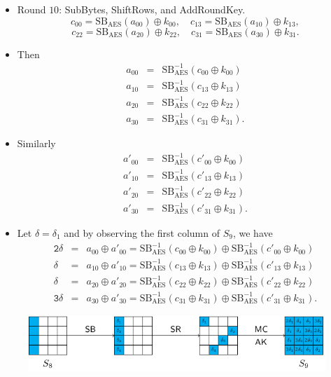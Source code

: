 \begin{frame}{}
    \begin{itemize}
        \item Round $10$: SubBytes, ShiftRows, and AddRoundKey.
\[
c_{00}=\text{SB}_{\text{AES}}(a_{00})\oplus k_{00},\quad c_{13}=\text{SB}_{\text{AES}}(a_{10})\oplus k_{13},
\]
\[
c_{22}=\text{SB}_{\text{AES}}(a_{20})\oplus k_{22},\quad
c_{31}=\text{SB}_{\text{AES}}(a_{30})\oplus k_{31}.
\] 
\item Then
\begin{eqnarray*}
    a_{00} &=& \text{SB}_{\text{AES}}^{-1}(c_{00}\oplus k_{00})\\
    a_{10} &=& \text{SB}_{\text{AES}}^{-1}(c_{13}\oplus k_{13})\\
    a_{20} &=& \text{SB}_{\text{AES}}^{-1}(c_{22}\oplus k_{22})\\
    a_{30} &=& \text{SB}_{\text{AES}}^{-1}(c_{31}\oplus k_{31}).
\end{eqnarray*}
\item Similarly
\begin{eqnarray*}
    a'_{00} &=& \text{SB}_{\text{AES}}^{-1}(c'_{00}\oplus k_{00})\\
    a'_{10} &=& \text{SB}_{\text{AES}}^{-1}(c'_{13}\oplus k_{13})\\
    a'_{20} &=& \text{SB}_{\text{AES}}^{-1}(c'_{22}\oplus k_{22})\\
    a'_{30} &=& \text{SB}_{\text{AES}}^{-1}(c'_{31}\oplus k_{31}).
\end{eqnarray*}
    \end{itemize}
\end{frame}


\begin{frame}{}
    \begin{itemize}
\item Let $\delta=\delta_1$ and by observing the first column of $S_9$, we have
\begin{eqnarray*}
\texttt{2}\delta &=& a_{00}\oplus a'_{00}=\text{SB}_{\text{AES}}^{-1}(c_{00}\oplus k_{00})\oplus \text{SB}_{\text{AES}}^{-1}(c'_{00}\oplus k_{00})\\
\delta &=& a_{10}\oplus a'_{10}=\text{SB}_{\text{AES}}^{-1}(c_{13}\oplus k_{13})\oplus \text{SB}_{\text{AES}}^{-1}(c'_{13}\oplus k_{13})\\
\delta &=& a_{20}\oplus a'_{20}=\text{SB}_{\text{AES}}^{-1}(c_{22}\oplus k_{22})\oplus \text{SB}_{\text{AES}}^{-1}(c'_{22}\oplus k_{22})\\
\texttt{3}\delta &=& a_{30}\oplus a'_{30}=\text{SB}_{\text{AES}}^{-1}(c_{31}\oplus k_{31})\oplus \text{SB}_{\text{AES}}^{-1}(c'_{31}\oplus k_{31}).
\end{eqnarray*}
    \end{itemize}
\begin{figure}
    \centering
    \includegraphics{fig/AES_Fault_Diagnol_Attack_Round_9.pdf}
\end{figure}
\end{frame}

